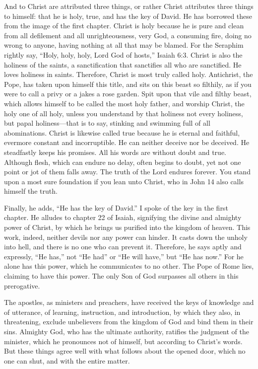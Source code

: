And to Christ are attributed three things, or rather Christ attributes three things to himself: that he is holy, true, and has the key of David. He has borrowed these from the image of the first chapter. Christ is holy because he is pure and clean from all defilement and all unrighteousness, very God, a consuming fire, doing no wrong to anyone, having nothing at all that may be blamed. For the Seraphim rightly say, “Holy, holy, holy, Lord God of hosts,” Isaiah 6:3. Christ is also the holiness of the saints, a sanctification that sanctifies all who are sanctified. He loves holiness in saints. Therefore, Christ is most truly called holy. Antichrist, the Pope, has taken upon himself this title, and sits on this beast so filthily, as if you were to call a privy or a jakes a rose garden. Spit upon that vile and filthy beast, which allows himself to be called the most holy father, and worship Christ, the holy one of all holy, unless you understand by that holiness not every holiness, but papal holiness—that is to say, stinking and swimming full of all abominations. Christ is likewise called true because he is eternal and faithful, evermore constant and incorruptible. He can neither deceive nor be deceived. He steadfastly keeps his promises. All his words are without doubt and true. Although flesh, which can endure no delay, often begins to doubt, yet not one point or jot of them falls away. The truth of the Lord endures forever. You stand upon a most sure foundation if you lean unto Christ, who in John 14 also calls himself the truth.

Finally, he adds, “He has the key of David.” I spoke of the key in the first chapter. He alludes to chapter 22 of Isaiah, signifying the divine and almighty power of Christ, by which he brings us purified into the kingdom of heaven. This work, indeed, neither devils nor any power can hinder. It casts down the unholy into hell, and there is no one who can prevent it. Therefore, he says aptly and expressly, “He has,” not “He had” or “He will have,” but “He has now.” For he alone has this power, which he communicates to no other. The Pope of Rome lies, claiming to have this power. The only Son of God surpasses all others in this prerogative.

The apostles, as ministers and preachers, have received the keys of knowledge and of utterance, of learning, instruction, and introduction, by which they also, in threatening, exclude unbelievers from the kingdom of God and bind them in their sins. Almighty God, who has the ultimate authority, ratifies the judgment of the minister, which he pronounces not of himself, but according to Christ’s words. But these things agree well with what follows about the opened door, which no one can shut, and with the entire matter.

